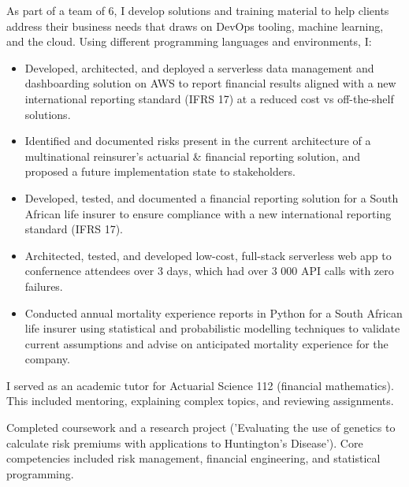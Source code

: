 \documentclass[10pt,a4paper,ragged2e,withhyper]{altacv}
\begin{document}
\begin{paracol}{2}
        

	    As part of a team of 6, I develop solutions and training material to help clients address their business needs that draws on DevOps tooling, machine learning, and the cloud. Using different programming languages and environments, I:
            \begin{itemize} %
	      \item Developed, architected, and deployed a serverless data management and dashboarding solution on AWS to report financial results aligned with a new international reporting standard (IFRS 17) at a reduced cost vs off-the-shelf solutions.
	      \item Identified and documented risks present in the current architecture of a multinational reinsurer's actuarial \& financial reporting solution, and proposed a future implementation state to stakeholders.
	      \item Developed, tested, and documented a financial reporting solution for a South African life insurer to ensure compliance with a new international reporting standard (IFRS 17).
	      \item Architected, tested, and developed low-cost, full-stack serverless web app to confernence attendees over 3 days, which had over 3 000 API calls with zero failures.
	      \item Conducted annual mortality experience reports in Python for a South African life insurer using statistical and probabilistic modelling techniques to validate current assumptions and advise on anticipated mortality experience for the company.
            \end{itemize}
        
            \divider
	      I served as an academic tutor for Actuarial Science 112 (financial mathematics). This included mentoring, explaining complex topics, and reviewing assignments. 
            

        
	    Completed coursework and a research project ('Evaluating the use of genetics to calculate risk premiums with applications to Huntington's Disease'). Core competencies included risk management, financial engineering, and statistical programming.


\end{paracol}
\end{document}
